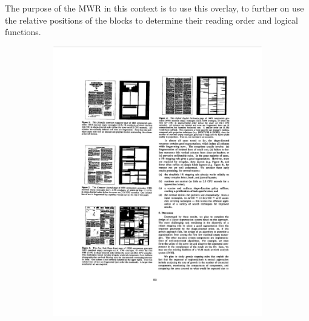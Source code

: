 \documentclass{report}
\begin{document}
The purpose of the MWR in this context is to use this overlay, to further on use the relative positions of the blocks to determine their reading
order and logical functions.

\begin{figure}
\centering
\begin{subfigure}{0.47\textwidth}
\includegraphics[width = \textwidth]{document1.png}
\end{subfigure}
\hspace*{0.03\textwidth}
\begin{subfigure}{0.47\textwidth}

\end{subfigure}
\end{figure}
\end{document}
